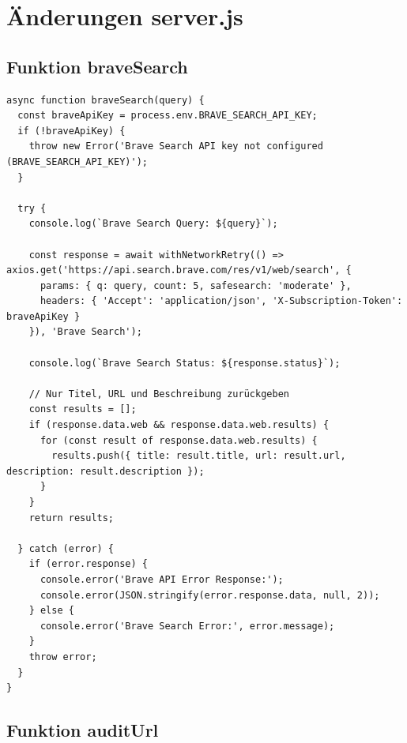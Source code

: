 \chapter{Änderungen server.js}\label{ch:anhang_server}

\section{Funktion braveSearch}

\begin{lstlisting}
async function braveSearch(query) {
  const braveApiKey = process.env.BRAVE_SEARCH_API_KEY;
  if (!braveApiKey) {
    throw new Error('Brave Search API key not configured (BRAVE_SEARCH_API_KEY)');
  }

  try {
    console.log(`Brave Search Query: ${query}`);

    const response = await withNetworkRetry(() => axios.get('https://api.search.brave.com/res/v1/web/search', {
      params: { q: query, count: 5, safesearch: 'moderate' },
      headers: { 'Accept': 'application/json', 'X-Subscription-Token': braveApiKey }
    }), 'Brave Search');

    console.log(`Brave Search Status: ${response.status}`);

    // Nur Titel, URL und Beschreibung zurückgeben
    const results = [];
    if (response.data.web && response.data.web.results) {
      for (const result of response.data.web.results) {
        results.push({ title: result.title, url: result.url, description: result.description });
      }
    }
    return results;

  } catch (error) {
    if (error.response) {
      console.error('Brave API Error Response:');
      console.error(JSON.stringify(error.response.data, null, 2));
    } else {
      console.error('Brave Search Error:', error.message);
    }
    throw error;
  }
}
\end{lstlisting}

\section{Funktion auditUrl}

